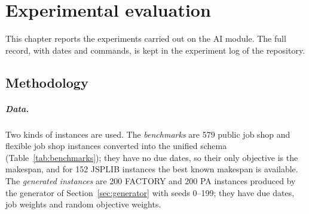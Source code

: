 \chapter{Experimental evaluation}
\label{chap:evaluation}

This chapter reports the experiments carried out on the AI module. The full record, with dates
and commands, is kept in the experiment log of the repository.


\section{Methodology}
\label{sec:methodology}

\paragraph{Data.} Two kinds of instances are used. The \emph{benchmarks} are 579 public job shop
and flexible job shop instances converted into the unified schema
(Table~\ref{tab:benchmarks}); they have no due dates, so their only objective is the makespan,
and for 152 JSPLIB instances the best known makespan is available. The \emph{generated
instances} are 200 FACTORY and 200 PA instances produced by the generator of
Section~\ref{sec:generator} with seeds 0--199; they have due dates, job weights and random
objective weights.

